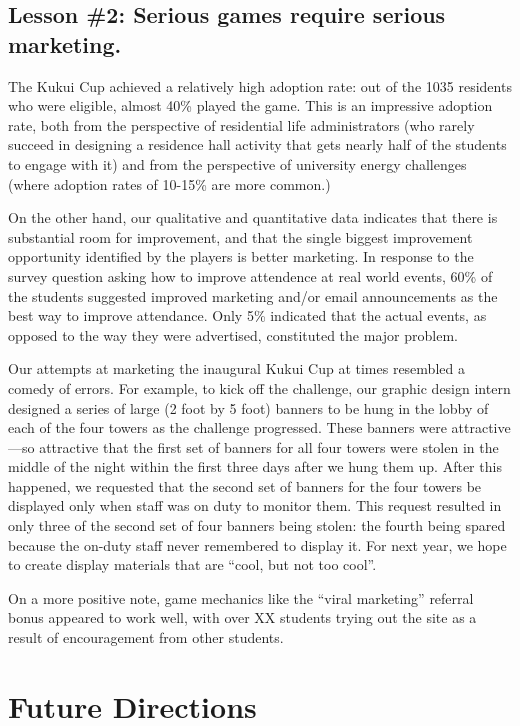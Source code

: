 \documentclass{acm_proc_article-sp}
\begin{document}
\subsection{Lesson \#2: Serious games require serious marketing.}

The Kukui Cup achieved a relatively high adoption rate: out of the 1035
residents who were eligible, almost 40\% played the game.  This is an
impressive adoption rate, both from the perspective of residential life
administrators (who rarely succeed in designing a residence hall activity
that gets nearly half of the students to engage with it) and from the
perspective of university energy challenges (where adoption rates of
10-15\% are more common.)  

On the other hand, our qualitative and quantitative data indicates that
there is substantial room for improvement, and that the single biggest
improvement opportunity identified by the players is better marketing.  In
response to the survey question asking how to improve attendence at real
world events, 60\% of the students suggested improved marketing and/or email
announcements as the best way to improve attendance.  Only 5\% indicated
that the actual events, as opposed to the way they were advertised,
constituted the major problem.

Our attempts at marketing the inaugural Kukui Cup at times resembled a
comedy of errors. For example, to kick off the challenge, our graphic
design intern designed a series of large (2 foot by 5 foot) banners to be
hung in the lobby of each of the four towers as the challenge progressed.
These banners were attractive---so attractive that the first set of banners
for all four towers were stolen in the middle of the night within the first
three days after we hung them up.  After this happened, we requested that
the second set of banners for the four towers be displayed only when staff
was on duty to monitor them.  This request resulted in only three of the
second set of four banners being stolen: the fourth being spared because
the on-duty staff never remembered to display it.  For next year, we hope
to create display materials that are ``cool, but not too cool''.

On a more positive note, game mechanics like the ``viral marketing''
referral bonus appeared to work well, with over XX students trying out the
site as a result of encouragement from other students.  


\section{Future Directions}
\end{document}
